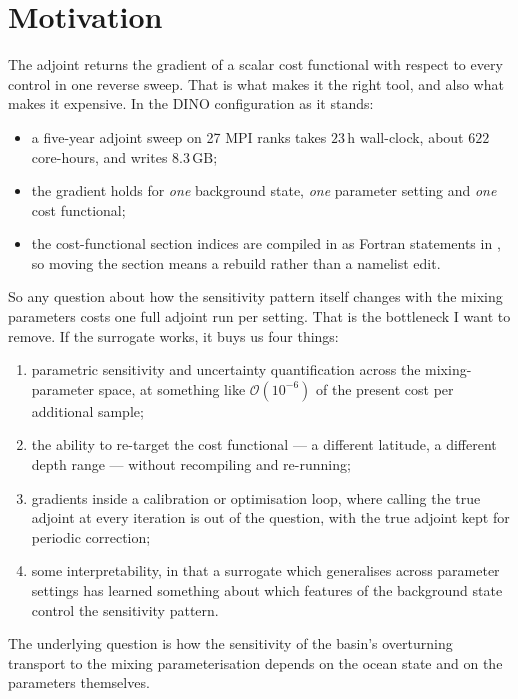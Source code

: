 \section{Motivation}
\label{sec:motivation}

The adjoint returns the gradient of a scalar cost functional with respect to
every control in one reverse sweep. That is what makes it the right tool, and
also what makes it expensive. In the DINO configuration as it stands:

\begin{itemize}[nosep]
  \item a five-year adjoint sweep on 27 MPI ranks takes $23\,\mathrm{h}$
        wall-clock, about $622$ core-hours, and writes $8.3\,\mathrm{GB}$;
  \item the gradient holds for \emph{one} background state, \emph{one}
        parameter setting and \emph{one} cost functional;
  \item the cost-functional section indices are compiled in as Fortran
         statements in , so moving
        the section means a rebuild rather than a namelist edit.
\end{itemize}

So any question about how the sensitivity pattern itself changes with the
mixing parameters costs one full adjoint run per setting. That is the
bottleneck I want to remove. If the surrogate works, it buys us four things:

\begin{enumerate}[nosep]
  \item parametric sensitivity and uncertainty quantification across the
        mixing-parameter space, at something like $\mathcal{O}(10^{-6})$ of the
        present cost per additional sample;
  \item the ability to re-target the cost functional --- a different latitude, a
        different depth range --- without recompiling and re-running;
  \item gradients inside a calibration or optimisation loop, where calling the
        true adjoint at every iteration is out of the question, with the true
        adjoint kept for periodic correction;
  \item some interpretability, in that a surrogate which generalises across
        parameter settings has learned something about which features of the
        background state control the sensitivity pattern.
\end{enumerate}

The underlying question is how the sensitivity of the basin's overturning
transport to the mixing parameterisation depends on the ocean state and on the
parameters themselves.

